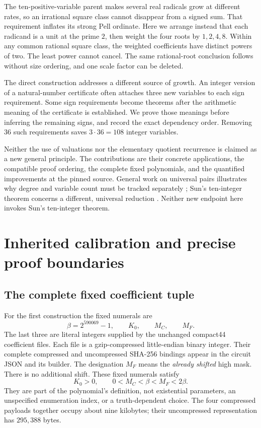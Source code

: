 \documentclass[11pt,letterpaper]{article}
\theoremstyle{definition}
\theoremstyle{remark}
\numberwithin{equation}{section}
\begin{document}
The ten-positive-variable parent makes several real radicals grow at
different rates, so an irrational square class cannot disappear from a
signed sum. That requirement inflates its strong Pell ordinate.
Here we arrange instead that each radicand is a unit at the prime $2$,
then weight the four roots by $1,2,4,8$. Within any common rational square
class, the weighted coefficients have distinct powers of two. The least
power cannot cancel. The same rational-root conclusion follows without
size ordering, and one scale factor can be deleted.

The direct construction addresses a different source of growth.
An integer version of a natural-number certificate often attaches three
new variables to each sign requirement. Some sign requirements become
theorems after the arithmetic meaning of the certificate is established.
We prove those meanings before inferring the remaining signs, and record
the exact dependency order. Removing $36$ such requirements saves
$3\cdot36=108$ integer variables.

Neither the use of valuations nor the elementary quotient recurrence is
claimed as a new general principle. The contributions are their concrete
applications, the compatible proof ordering, the complete fixed
polynomials, and the quantified improvements at the pinned source.
General work on universal pairs illustrates why degree and variable
count must be tracked separately \cite{bayer2026}; Sun's ten-integer
theorem concerns a different, universal reduction \cite{sun2026}.
Neither new endpoint here invokes Sun's ten-integer theorem.

\section{Inherited calibration and precise proof boundaries}
\label{sec:calibration}

\subsection{The complete fixed coefficient tuple}

For the first construction the fixed numerals are
\[
   \beta=2^{590069}-1,\qquad K_0,\qquad M_C,\qquad M_F.
\]
The last three are literal integers supplied by the unchanged compact44
coefficient files. Each file is a gzip-compressed little-endian binary
integer. Their complete compressed and uncompressed SHA-256 bindings
appear in the circuit JSON and its builder. The designation $M_F$ means
the \emph{already shifted} high mask. There is no additional shift.
These fixed numerals satisfy
\begin{equation}\label{eq:ports}
 K_0>0,\qquad 0<M_C<\beta<M_F<2\beta.
\end{equation}
They are part of the polynomial's definition, not existential parameters,
an unspecified enumeration index, or a truth-dependent choice.
The four compressed payloads together occupy about nine kilobytes;
their uncompressed representation has $295,388$ bytes.
\end{document}
